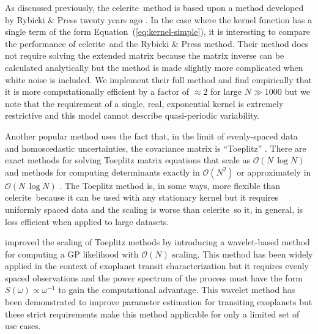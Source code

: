 \documentclass[manuscript, letterpaper]{aastex6}
\newcommand{\project}[1]{\textsf{#1}}
\newcommand{\celerite}{\project{celerite}}
\renewcommand{\eqref}[1]{\ref{eq:#1}}
\newcommand{\Eq}[1]{Equation~(\eqref{#1})}
\newcommand{\eq}[1]{\Eq{#1}}
\begin{document}
As discussed previously, the \celerite\ method is based upon a method
developed by Rybicki \& Press twenty years ago \citep{Rybicki:1995}.
In the case where the kernel function has a single term of the form
\eq{kernel-simple}, it is interesting to compare the performance of \celerite\
and the Rybicki \& Press method.
Their method does not require solving the extended matrix because the matrix
inverse can be calculated analytically but the method is made slightly more
complicated when white noise is included.
We implement their full method and find empirically that it is more
computationally efficient by a factor of $\approx 2$ for large $N \gg 1000$
but we note that the requirement of a single, real, exponential kernel is
extremely restrictive and this model cannot describe quasi-periodic
variability.

Another popular method uses the fact that, in the limit of evenly-spaced data
and homoscedastic uncertainties, the covariance matrix is ``Toeplitz''
\citep[for example][]{Dillon:2013}.
There are exact methods for solving Toeplitz matrix equations that scale as
$\mathcal{O}(N\,\log N)$ and methods for computing determinants exactly in
$\mathcal{O}(N^2)$ or approximately in $\mathcal{O}(N\,\log N)$
\citep{Wilson:2014}.
The Toeplitz method is, in some ways, more flexible than \celerite\ because it
can be used with any stationary kernel but it requires uniformly spaced data
and the scaling is worse than \celerite\ so it, in general, is less
efficient when applied to large datasets.

\citet{Carter:2009} improved the scaling of Toeplitz methods by introducing a
wavelet-based method for computing a GP likelihood with $\mathcal{O}(N)$
scaling.
This method has been widely applied in the context of exoplanet transit
characterization but it requires evenly spaced observations and the power
spectrum of the process must have the form $S(\omega)\propto \omega^{-1}$ to
gain the computational advantage.
This wavelet method has been demonstrated to improve parameter estimation for
transiting exoplanets \citep{Carter:2009} but these strict requirements make
this method applicable for only a limited set of use cases.
\end{document}
